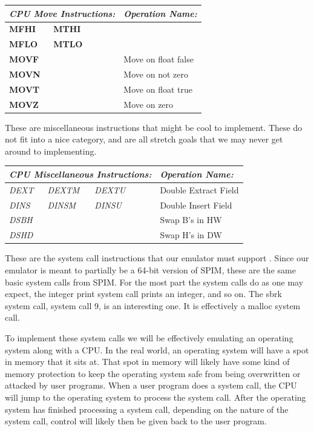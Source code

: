 \documentclass[parskip=half, fontsize=12pt]{scrartcl}
\begin{document}
\begin{tabularx}{\textwidth}{@{}lllll|X@{}}
    \multicolumn{5}{l|}{\emph{CPU Move Instructions:}} & \emph{Operation Name:} \\\hline
    \textbf{MFHI} & \textbf{MTHI} & & &                & \\
    \textbf{MFLO} & \textbf{MTLO} & & &                & \\
    \textbf{MOVF} & & & &                              & Move on float false \\
    \textbf{MOVN} & & & &                              & Move on not zero \\
    \textbf{MOVT} & & & &                              & Move on float true \\
    \textbf{MOVZ} & & & &                              & Move on zero \\
\end{tabularx}

These are miscellaneous instructions that might be cool to implement.
These do not fit into a nice category, and are all stretch goals that we
may never get around to implementing.

\begin{tabularx}{\textwidth}{@{}lllll|X@{}}
    \multicolumn{5}{l|}{\emph{CPU Miscellaneous Instructions:}} & \emph{Operation Name:} \\\hline
    \emph{DEXT} & \emph{DEXTM} & \emph{DEXTU} & &               & Double Extract Field \\
    \emph{DINS} & \emph{DINSM} & \emph{DINSU} & &               & Double Insert Field \\
    \emph{DSBH} & & & &                                         & Swap B's in HW \\
    \emph{DSHD} & & & &                                         & Swap H's in DW \\
\end{tabularx}

These are the system call instructions that our emulator must support \cite{spim-system-calls}.
Since our emulator is meant to partially be a 64-bit version of SPIM,
these are the same basic system calls from SPIM. For the most part the
system calls do as one may expect, the integer print system call prints
an integer, and so on. The sbrk system call, system call 9, is an
interesting one. It is effectively a malloc system call.

To implement these system calls we will be effectively emulating an
operating system along with a CPU. In the real world, an operating
system will have a spot in memory that it sits at. That spot in memory
will likely have some kind of memory protection to keep the operating
system safe from being overwritten or attacked by user programs. When a
user program does a system call, the CPU will jump to the operating
system to process the system call. After the operating system has
finished processing a system call, depending on the nature of the system
call, control will likely then be given back to the user program.
\end{document}
